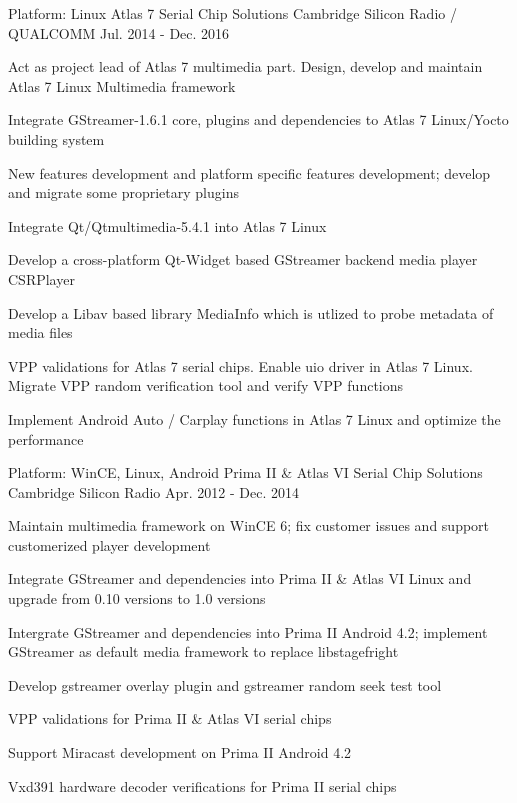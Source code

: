 \begin{cventries}
  \cventry
    {Platform: Linux} %
    {Atlas 7 Serial Chip Solutions} %
    {Cambridge Silicon Radio / QUALCOMM} %
    {Jul. 2014 - Dec. 2016} %
    {
      \begin{cvitems} %
        \item {Act as project lead of Atlas 7 multimedia part. Design, develop and maintain Atlas 7 Linux Multimedia framework}
        \item {Integrate GStreamer-1.6.1 core, plugins and dependencies to Atlas 7 Linux/Yocto building system}
        \item {New features development and platform specific features development; develop and migrate some proprietary plugins}
        \item {Integrate Qt/Qtmultimedia-5.4.1 into Atlas 7 Linux}
        \item {Develop a cross-platform Qt-Widget based GStreamer backend media player CSRPlayer}
        \item {Develop a Libav based library MediaInfo which is utlized to probe metadata of media files}
        \item {VPP validations for Atlas 7 serial chips. Enable uio driver in Atlas 7 Linux. Migrate VPP random verification tool and verify VPP functions}
        \item {Implement Android Auto / Carplay functions in Atlas 7 Linux and optimize the performance}
      \end{cvitems}
    }

  \cventry
    {Platform: WinCE, Linux, Android} %
    {Prima II \& Atlas VI Serial Chip Solutions} %
    {Cambridge Silicon Radio} %
    {Apr. 2012 - Dec. 2014} %
    {
      \begin{cvitems} %
        \item {Maintain multimedia framework on WinCE 6; fix customer issues and support customerized player development}
        \item {Integrate GStreamer and dependencies into Prima II \& Atlas VI Linux and upgrade from 0.10 versions to 1.0 versions}
        \item {Intergrate GStreamer and dependencies into Prima II Android 4.2; implement GStreamer as default media framework to replace libstagefright}
        \item {Develop gstreamer overlay plugin and gstreamer random seek test tool}
        \item {VPP validations for Prima II \& Atlas VI serial chips}
        \item {Support Miracast development on Prima II Android 4.2}
        \item {Vxd391 hardware decoder verifications for Prima II serial chips}
      \end{cvitems}
    }

\end{cventries}

